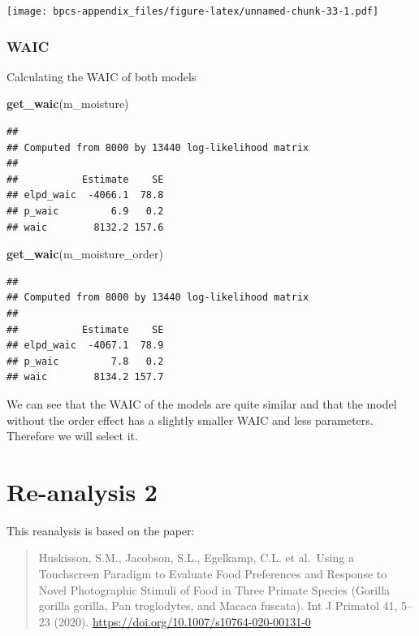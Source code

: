 \documentclass[
]{book}
\newenvironment{Shaded}{\begin{snugshade}}{\end{snugshade}}
\newcommand{\KeywordTok}[1]{\textcolor[rgb]{0.13,0.29,0.53}{\textbf{#1}}}
\newcommand{\NormalTok}[1]{#1}
\begin{document}
\texttt{[image: bpcs-appendix\_files/figure-latex/unnamed-chunk-33-1.pdf]}

\hypertarget{waic}{%
\subsection{WAIC}\label{waic}}

Calculating the WAIC of both models

\begin{Shaded}
\begin{Highlighting}[]
\KeywordTok{get_waic}\NormalTok{(m_moisture)}
\end{Highlighting}
\end{Shaded}

\begin{verbatim}
## 
## Computed from 8000 by 13440 log-likelihood matrix
## 
##           Estimate    SE
## elpd_waic  -4066.1  78.8
## p_waic         6.9   0.2
## waic        8132.2 157.6
\end{verbatim}

\begin{Shaded}
\begin{Highlighting}[]
\KeywordTok{get_waic}\NormalTok{(m_moisture_order)}
\end{Highlighting}
\end{Shaded}

\begin{verbatim}
## 
## Computed from 8000 by 13440 log-likelihood matrix
## 
##           Estimate    SE
## elpd_waic  -4067.1  78.9
## p_waic         7.8   0.2
## waic        8134.2 157.7
\end{verbatim}

We can see that the WAIC of the models are quite similar and that the model without the order effect has a slightly smaller WAIC and less parameters. Therefore we will select it.

\hypertarget{studyII}{%
\chapter{Re-analysis 2}\label{studyII}}

This reanalysis is based on the paper:

\begin{quote}
Huskisson, S.M., Jacobson, S.L., Egelkamp, C.L. et al.~Using a Touchscreen Paradigm to Evaluate Food Preferences and Response to Novel Photographic Stimuli of Food in Three Primate Species (Gorilla gorilla gorilla, Pan troglodytes, and Macaca fuscata). Int J Primatol 41, 5--23 (2020). \url{https://doi.org/10.1007/s10764-020-00131-0}
\end{quote}
\end{document}
